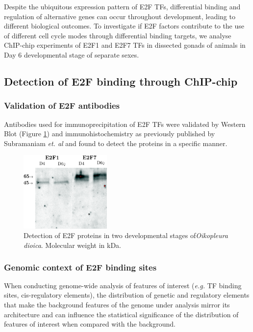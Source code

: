 \documentclass[11pt,twoside,a4paper]{report}
\begin{document}
	Despite the ubiquitous expression pattern of E2F TFs, differential binding and regulation of alternative genes can occur throughout development, leading to different biological outcomes. To investigate if E2F factors contribute to the use of different cell cycle modes through differential binding targets, we analyse ChIP-chip experiments of E2F1 and E2F7 TFs in dissected gonads of animals in Day 6 developmental stage of separate sexes.

	\subsection{Detection of E2F binding through ChIP-chip}
		\subsubsection{Validation of E2F antibodies}
		Antibodies used for immunoprecipitation of E2F TFs were validated by Western Blot (Figure \ref{fig:E2F_westerns}) and immunohistochemistry as previously published by Subramaniam \textit{et. al} \cite{Subramaniam2014} and found to detect the proteins in a specific manner.
		
		\begin{figure}[here]
			\setlength{\belowcaptionskip}{5pt}
			\centering
			\includegraphics[width=0.4\textwidth]{pngs/E2Fs_western.png}
			\caption{Detection of E2F proteins in two developmental stages of\textit{Oikopleura dioica}.
				{\footnotesize 
					Molecular weight in kDa.
				}
			}
			\label{fig:E2F_westerns}
		\end{figure}
	
		\subsubsection{Genomic context of E2F binding sites}
		When conducting genome-wide analysis of features of interest (\textit{e.g.} TF binding sites, cis-regulatory elements), the distribution of genetic and regulatory elements that make the background features of the genome under analysis mirror its architecture and can influence the statistical significance of the distribution of features of interest when compared with the background.
		
\end{document}
